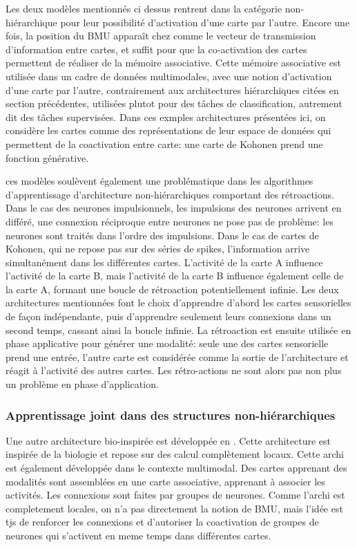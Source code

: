 \documentclass[../main]{subfiles}
\begin{document}
Les deux modèles mentionnés ci dessus rentrent dans la catégorie non-hiérarchique pour leur possibilité d'activation d'une carte par l'autre. Encore une fois, la position du BMU apparaît chez \cite{dominey13} comme le vecteur de transmission d'information  entre cartes, et suffit pour que la co-activation des cartes permettent de réaliser de la mémoire associative.
Cette mémoire associative est utilisée dans un cadre de données multimodales, avec une notion d'activation d'une carte par l'autre, contrairement aux architectures hiérarchiques citées en section précédentes, utilisées plutot pour des tâches de classification, autrement dit des tâches supervisées.
Dans ces exmples architectures présentées ici, on considère les cartes comme des représentations de leur espace de données qui permettent de la coactivation entre carte: une carte de Kohonen prend une fonction générative.

ces modèles soulèvent également une problématique dans les algorithmes d'apprentissage d'architecture non-hiérarchiques comportant des rétroactions. Dans le cas des neurones impulsionnels, les impulsions des neurones arrivent en différé, une connexion réciproque entre neurones ne pose pas de problème: les neurones sont traités dans l'ordre des impulsions. Dans le cas de cartes de Kohonen, qui ne repose pas sur des séries de spikes, l'information arrive simultanément dans les différentes cartes. L'activité de la carte A influence l'activité de la carte B, mais l'activité de la carte B influence également celle de la carte A, formant une boucle de rétroaction potentiellement infinie. Les deux architectures mentionnées font le choix d'apprendre d'abord les cartes sensorielles de façon indépendante, puis d'apprendre seulement leurs connexions dans un second temps, cassant ainsi la boucle infinie. 
La rétroaction est ensuite utilisée en phase applicative pour générer une modalité: seule une des cartes sensorielle prend une entrée, l'autre carte est considérée comme la sortie de l'architecture et réagit à l'activité des autres cartes. Les rétro-actions ne sont alors pas non plus un problème en phase d'application.

\subsubsection{Apprentissage joint dans des structures non-hiérarchiques}

Une autre architecture bio-inspirée est développée en \cite{menard05}. Cette architecture est inspirée de la biologie et repose sur des calcul complètement locaux. Cette archi est également développée dans le contexte multimodal. Des cartes apprenant des modalités sont assemblées en une carte associative, apprenant à associer les activités. Les connexions sont faites par groupes de neurones. Comme l'archi est completement locales, on n'a pas directement la notion de BMU, mais l'idée est tjs de renforcer les connexions et d'autoriser la coactivation de groupes de neurones qui s'activent en meme temps dans différentes cartes.
\end{document}
